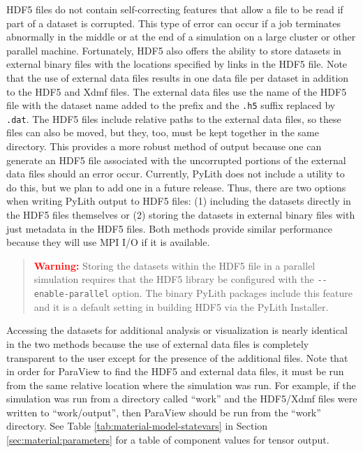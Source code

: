 HDF5 files do not contain self-correcting features that allow a file
to be read if part of a dataset is corrupted. This type of error can
occur if a job terminates abnormally in the middle or at the end of
a simulation on a large cluster or other parallel machine. Fortunately,
HDF5 also offers the ability to store datasets in external binary
files with the locations specified by links in the HDF5 file. Note
that the use of external data files results in one data file per dataset
in addition to the HDF5 and Xdmf files. The external data files use
the name of the HDF5 file with the dataset name added to the prefix
and the \texttt{.h5} suffix replaced by \texttt{.dat}. The HDF5 files
include relative paths to the external data files, so these files
can also be moved, but they, too, must be kept together in the same
directory. This provides a more robust method of output because one
can generate an HDF5 file associated with the uncorrupted portions
of the external data files should an error occur. Currently, PyLith
does not include a utility to do this, but we plan to add one in a
future release. Thus, there are two options when writing PyLith output
to HDF5 files: (1) including the datasets directly in the HDF5 files
themselves or (2) storing the datasets in external binary files with
just metadata in the HDF5 files. Both methods provide similar performance
because they will use MPI I/O if it is available. 
\begin{quote}
\textbf{\textcolor{red}{Warning:}}\textbf{ }Storing the datasets within
the HDF5 file in a parallel simulation requires that the HDF5 library
be configured with the \texttt{-{}-enable-parallel} option. The binary
PyLith packages include this feature and it is a default setting in
building HDF5 via the PyLith Installer.
\end{quote}
Accessing the datasets for additional analysis or visualization is
nearly identical in the two methods because the use of external data
files is completely transparent to the user except for the presence
of the additional files. Note that in order for ParaView to find the
HDF5 and external data files, it must be run from the same relative
location where the simulation was run. For example, if the simulation
was run from a directory called ``work'' and the HDF5/Xdmf files
were written to ``work/output'', then ParaView should be run from
the ``work'' directory. See Table \ref{tab:material-model-statevars}
in Section \ref{sec:material:parameters} for a table of component
values for tensor output.


